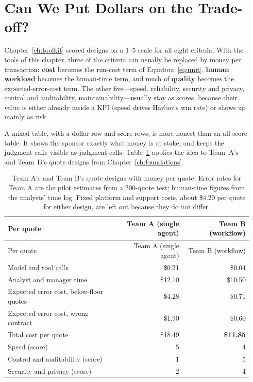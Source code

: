 
\section{Can We Put Dollars on the Trade-off?}
\label{sec:money-tradeoff}

Chapter~\ref{ch:toolkit} scored designs on a 1--5 scale for all eight criteria. With the tools of this chapter, three of the criteria can usually be replaced by money per transaction: \textbf{cost} becomes the run-cost term of Equation~\eqref{eq:unit}, \textbf{human workload} becomes the human-time term, and much of \textbf{quality} becomes the expected-error-cost term. The other five---speed, reliability, security and privacy, control and auditability, maintainability---usually stay as scores, because their value is either already inside a KPI (speed drives Harbor's win rate) or shows up mainly as risk.

A mixed table, with a dollar row and score rows, is more honest than an all-score table. It shows the sponsor exactly what money is at stake, and keeps the judgment calls visible as judgment calls. Table~\ref{tab:money} applies the idea to Team~A's and Team~B's quote designs from Chapter~\ref{ch:foundations}.

\begingroup
\small
\begin{longtable}{@{}lrr@{}}
\caption{Team A's and Team B's quote designs with money per quote. Error rates for Team A are the pilot estimates from a 200-quote test; human-time figures from the analysts' time log. Fixed platform and support costs, about \$4.20 per quote for either design, are left out because they do not differ.}\label{tab:money}\\
\toprule
\rowcolor{coHead} Per quote & \cellcolor{coRedBg}Team A (single agent) & \cellcolor{coGreenBg}Team B (workflow) \\
\midrule
\endfirsthead
\toprule
\rowcolor{coHead} Per quote & \cellcolor{coRedBg}Team A (single agent) & \cellcolor{coGreenBg}Team B (workflow) \\
\midrule
\endhead
Model and tool calls & \$0.21 & \$0.04 \\
Analyst and manager time & \$12.10 & \$10.50 \\
Expected error cost, below-floor quotes & \$4.28 & \$0.71 \\
Expected error cost, wrong contract & \$1.90 & \$0.60 \\
\midrule
\rowcolor{coAmberBg} Total cost per quote & \$18.49 & \textbf{\$11.85} \\
\midrule
Speed (score) & 5 & 4 \\
Control and auditability (score) & 1 & 5 \\
Security and privacy (score) & 2 & 4 \\
\bottomrule
\end{longtable}
\endgroup

